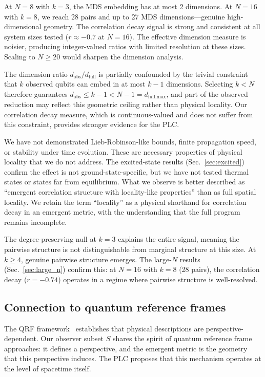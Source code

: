 \documentclass[aps,pra,twocolumn,superscriptaddress]{revtex4-2}
\begin{document}
At $N = 8$ with $k = 3$, the MDS embedding has at most 2 dimensions. At $N = 16$ with $k = 8$, we reach 28 pairs and up to 27 MDS dimensions---genuine high-dimensional geometry. The correlation decay signal is strong and consistent at all system sizes tested ($r \approx -0.7$ at $N = 16$). The effective dimension measure is noisier, producing integer-valued ratios with limited resolution at these sizes. Scaling to $N \geq 20$ would sharpen the dimension analysis.

The dimension ratio $d_\text{obs}/d_\text{full}$ is partially confounded by the trivial constraint that $k$ observed qubits can embed in at most $k - 1$ dimensions. Selecting $k < N$ therefore guarantees $d_\text{obs} \leq k - 1 < N - 1 = d_\text{full,max}$, and part of the observed reduction may reflect this geometric ceiling rather than physical locality. Our correlation decay measure, which is continuous-valued and does not suffer from this constraint, provides stronger evidence for the PLC.

We have not demonstrated Lieb-Robinson-like bounds, finite propagation speed, or stability under time evolution. These are necessary properties of physical locality that we do not address. The excited-state results (Sec.~\ref{sec:excited}) confirm the effect is not ground-state-specific, but we have not tested thermal states or states far from equilibrium. What we observe is better described as ``emergent correlation structure with locality-like properties'' than as full spatial locality. We retain the term ``locality'' as a physical shorthand for correlation decay in an emergent metric, with the understanding that the full program remains incomplete.

The degree-preserving null at $k = 3$ explains the entire signal, meaning the pairwise structure is not distinguishable from marginal structure at this size. At $k \geq 4$, genuine pairwise structure emerges. The large-$N$ results (Sec.~\ref{sec:large_n}) confirm this: at $N = 16$ with $k = 8$ (28 pairs), the correlation decay ($r = -0.74$) operates in a regime where pairwise structure is well-resolved.

\subsection{Connection to quantum reference frames}

The QRF framework~\cite{giacomini2019,vanrietvelde2020} establishes that physical descriptions are perspective-dependent. Our observer subset $S$ shares the spirit of quantum reference frame approaches: it defines a perspective, and the emergent metric is the geometry that this perspective induces. The PLC proposes that this mechanism operates at the level of spacetime itself.
\end{document}
